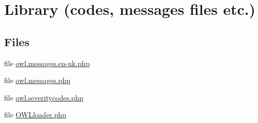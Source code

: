 \hypertarget{group__OWL__LIBRARY}{
\section{Library (codes, messages files etc.)}
\label{group__OWL__LIBRARY}
}
\subsection*{Files}
\begin{CompactItemize}
\item 
file \hyperlink{owl_8messages_8en-uk_8php}{owl.messages.en-uk.php}
\item 
file \hyperlink{owl_8messages_8php}{owl.messages.php}
\item 
file \hyperlink{owl_8severitycodes_8php}{owl.severitycodes.php}
\item 
file \hyperlink{OWLloader_8php}{OWLloader.php}
\end{CompactItemize}
